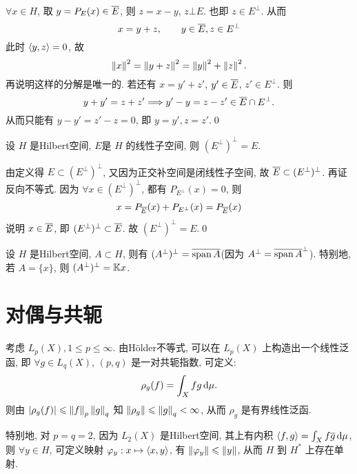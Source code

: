 \begin{Proof}
	$ \forall x\in H $, 取 $ y=P_{E}(x)\in \baro{E} $, 则 $ z=x-y $, $ z\bot E $. 也即 $ z\in E^{\bot} $. 从而
	\[
		x=y+z, \qquad y\in \baro{E}, z\in E^{\bot}
	\]
	此时 $ \lrangle{y, z}=0 $, 故
	\[
		\norm{x}^{2}=\norm{y+z}^{2}=\norm{y}^{2}+\norm{z}^{2}.
	\]
	再说明这样的分解是唯一的. 若还有 $ x=y'+z' $, $ y'\in\baro{E} $, $ z'\in E^{\bot} $. 则
	\[
		y+y'=z+z' \Longrightarrow y'-y=z-z'\in \baro{E}\cap E^{\bot}.
	\]
	从而只能有 $ y-y'=z'-z=0 $, 即 $ y=y', z=z' $.\qed
\end{Proof}

\begin{Corollary}
	设 $ H $ 是Hilbert空间, $ E $是 $ H $ 的线性子空间, 则 $ (E^{\bot})^{\bot}=E $.
\end{Corollary}

\begin{Proof}
	由定义得 $ E\subset (E^{\bot})^{\bot} $, 又因为正交补空间是闭线性子空间, 故 $ \baro{E}\subset (E^{\bot})^{\bot} $. 再证反向不等式. 因为 $ \forall x\in(E^{\bot})^{\bot}  $, 都有 $ P_{E^{\bot}}(x)=0 $, 则
	\[
		x=P_{\baro{E}}(x)+P_{E^{\bot}}(x)=P_{\baro{E}}(x)
	\]
	说明 $ x\in\baro{E} $, 即 $ (E^{\bot})^{\bot}\subset \baro{E} $. 故 $ (E^{\bot})^{\bot}=E $.\qed
\end{Proof}

\begin{Remark}
	设 $ H $ 是Hilbert空间, $ A\subset H $, 则有 $ (A^{\bot})^{\bot}=\baro{\Span A} $(因为 $ A^{\bot}=\baro{\Span A}^{\bot} $). 特别地, 若 $ A=\{ x \} $, 则 $ (A^{\bot})^{\bot}=\K x $.
\end{Remark}

\section{对偶与共轭}

考虑 $ L_{p}(X), 1\leqslant p\leqslant\infty $. 由H\"older不等式, 可以在 $ L_{p}(X) $ 上构造出一个线性泛函, 即 $ \forall g\in L_{q}(X) $, $ (p, q) $ 是一对共轭指数, 可定义:
\[
	\rho_{g}(f)=\int_{X}fg\diff\mu.
\]
则由 $ \abs{\rho_{g}(f)}\leqslant\norm{f}_{p}\norm{g}_{q} $ 知 $ \norm{\rho_{g}}\leqslant\norm{g}_{q}<\infty $, 从而 $ \rho_{g} $ 是有界线性泛函.

特别地, 对 $ p=q=2 $, 因为 $ L_{2}(X) $ 是Hilbert空间, 其上有内积 $ \lrangle{f, g}=\int_{X}f\baro{g}\diff\mu $, 则 $ \forall y\in H $, 可定义映射 $ \varphi_{y}:x\mapsto \lrangle{x, y} $, 有 $ \norm{\varphi_{y}}\leqslant\norm{y} $, 从而 $ H $ 到 $ H^{*} $ 上存在单射.

